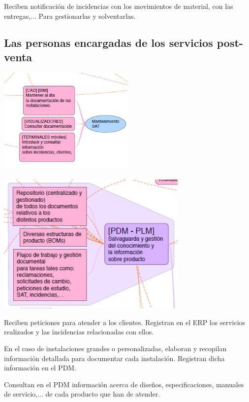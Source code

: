 \documentclass[spanish,12pt,a4paper,final,oneside]{book}
\begin{document}
Reciben notificación de incidencias con los movimientos de material, con las entregas,... Para gestionarlas y solventarlas.

\subsection{Las personas encargadas de los servicios post-venta}
\includegraphics[width=0.5\textwidth]{subesquema - postventa01}
\\\\ \includegraphics[width=0.7\textwidth]{subesquema - postventa02}

Reciben peticiones para atender a los clientes. Registran en el ERP los servicios realizados y las incidencias relacionadas con ellos.

En el caso de instalaciones grandes o personalizadas, elaboran y recopilan información detallada para documentar cada instalación. Registran dicha información en el PDM.

Consultan en el PDM información acerca de diseños, especificaciones, manuales de servicio,... de cada producto que han de atender.
\end{document}
